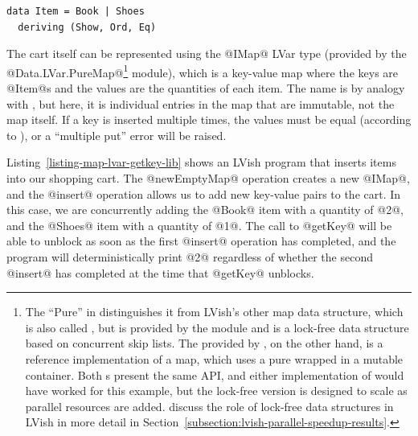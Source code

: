 \singlespacing
\begin{lstlisting}
data Item = Book | Shoes
  deriving (Show, Ord, Eq)
\end{lstlisting}
\doublespacing

\noindent The cart itself can be represented using the @IMap@ LVar
type (provided by the @Data.LVar.PureMap@\footnote{The ``Pure'' in
   distinguishes it from LVish's other map data
  structure, which is also called , but is provided by the
   module and is a lock-free data structure based
  on concurrent skip lists.  The  provided by
  , on the other hand, is a reference
  implementation of a map, which uses a pure  wrapped in
  a mutable container.  Both s present the same API, and
  either implementation of  would have worked for this
  example, but the lock-free version is designed to scale as parallel
  resources are added.   discuss the role of lock-free
  data structures in LVish in more detail in
  Section~\ref{subsection:lvish-parallel-speedup-results}.} module),
which is a key-value map where the keys are @Item@s and the values are
the quantities of each item.  The name  is by analogy with
, but here, it is individual entries in the map that are
immutable, not the map itself.  If a key is inserted multiple times,
the values must be equal (according to \il{==}), or a ``multiple put''
error will be raised.

\singlespacing

\doublespacing

Listing~\ref{listing-map-lvar-getkey-lib} shows an LVish program that
inserts items into our shopping cart.  The @newEmptyMap@ operation
creates a new @IMap@, and the @insert@ operation allows us to add new
key-value pairs to the cart.  In this case, we are concurrently adding
the @Book@ item with a quantity of @2@, and the @Shoes@ item with a
quantity of @1@.  The call to @getKey@ will be able to unblock as soon
as the first @insert@ operation has completed, and the program will
deterministically print @2@ regardless of whether the second @insert@
has completed at the time that @getKey@ unblocks.

